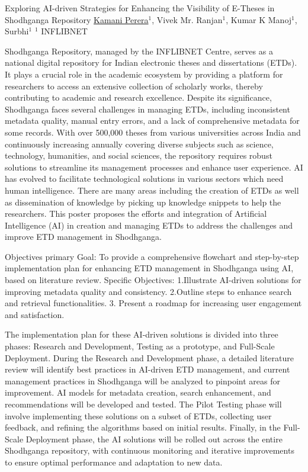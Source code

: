 
    \begin{abstract_online}{Exploring AI-driven Strategies for Enhancing the Visibility of E-Theses in Shodhganga Repository}{%
    \underline{Kamani Perera}$^{1}$, Vivek Mr. Ranjan$^{1}$, Kumar K Manoj$^{1}$, Surbhi$^{1}$}{%
    $^1$ INFLIBNET%
}

Shodhganga Repository, managed by the INFLIBNET Centre, serves as a national digital repository for Indian electronic theses and dissertations (ETDs). It plays a crucial role in the academic ecosystem by providing a platform for researchers to access an extensive collection of scholarly works, thereby contributing to academic and research excellence. Despite its significance, Shodhganga faces several challenges in managing ETDs, including inconsistent metadata quality, manual entry errors, and a lack of comprehensive metadata for some records. With over 500,000 theses from various universities across India and continuously increasing annually covering diverse subjects such as science, technology, humanities, and social sciences, the repository requires robust solutions to streamline its management processes and enhance user experience. AI has evolved to facilitate technological solutions in various sectors which need human intelligence. There are many areas including the creation of ETDs as well as dissemination of knowledge by picking up knowledge snippets to help the researchers. This poster proposes the efforts and integration of Artificial Intelligence (AI) in creation and managing ETDs to address the challenges and improve ETD management in Shodhganga.

	Objectives
	primary Goal: To provide a comprehensive flowchart and step-by-step implementation plan for enhancing ETD management in Shodhganga using AI, based on literature review.
Specific Objectives:
    1.Illustrate AI-driven solutions for improving metadata quality and consistency.
    2.Outline steps to enhance search and retrieval functionalities.
    3. Present a roadmap for increasing user engagement and satisfaction.

The implementation plan for these AI-driven solutions is divided into three phases: Research and Development, Testing as a prototype, and Full-Scale Deployment. During the Research and Development phase, a detailed literature review will identify best practices in AI-driven ETD management, and current management practices in Shodhganga will be analyzed to pinpoint areas for improvement. AI models for metadata creation, search enhancement, and recommendations will be developed and tested. The Pilot Testing phase will involve implementing these solutions on a subset of ETDs, collecting user feedback, and refining the algorithms based on initial results. Finally, in the Full-Scale Deployment phase, the AI solutions will be rolled out across the entire Shodhganga repository, with continuous monitoring and iterative improvements to ensure optimal performance and adaptation to new data.


\end{abstract_online}

